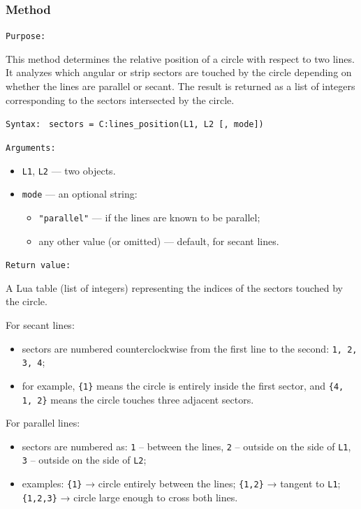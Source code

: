 \subsubsection{Method }
\label{ssub:method_circle_lines_position}

\texttt{Purpose: }

This method determines the relative position of a circle with respect to two lines.
It analyzes which angular or strip sectors are touched by the circle depending on whether the lines are parallel or secant.
The result is returned as a list of integers corresponding to the sectors intersected by the circle.

\texttt{Syntax: } \verb|sectors = C:lines_position(L1, L2 [, mode])|

\texttt{Arguments: }

\begin{itemize}
  \item \texttt{L1}, \texttt{L2} — two  objects.
  \item \texttt{mode} — an optional string:
    \begin{itemize}
      \item \texttt{"parallel"} — if the lines are known to be parallel;
      \item any other value (or omitted) — default, for secant lines.
    \end{itemize}
\end{itemize}

\texttt{Return value: }

A Lua table (list of integers) representing the indices of the sectors touched by the circle.

\medskip
For secant lines:
\begin{itemize}
  \item sectors are numbered counterclockwise from the first line to the second:
        \texttt{1, 2, 3, 4};
  \item for example, \texttt{\{1\}} means the circle is entirely inside the first sector,
        and \texttt{\{4, 1, 2\}} means the circle touches three adjacent sectors.
\end{itemize}

For parallel lines:
\begin{itemize}
  \item sectors are numbered as:
        \texttt{1} – between the lines,
        \texttt{2} – outside on the side of \texttt{L1},
        \texttt{3} – outside on the side of \texttt{L2};
  \item examples:
        \texttt{\{1\}} → circle entirely between the lines;
        \texttt{\{1,2\}} → tangent to \texttt{L1};
        \texttt{\{1,2,3\}} → circle large enough to cross both lines.
\end{itemize}

